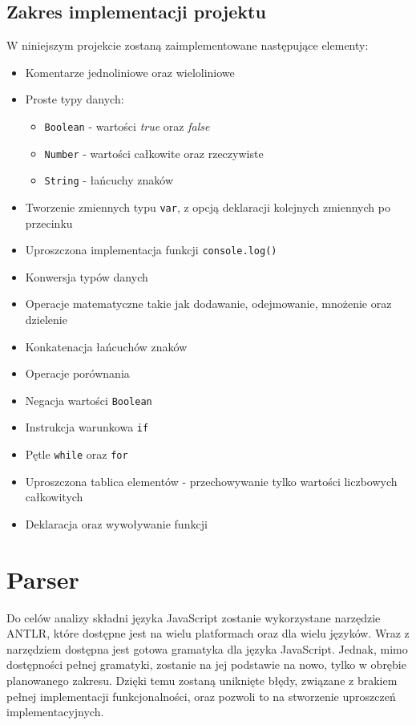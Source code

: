 \subsection{Zakres implementacji projektu}
W niniejszym projekcie zostaną zaimplementowane następujące elementy: 
\begin{itemize}
  \item Komentarze jednoliniowe oraz wieloliniowe
  \item Proste typy danych: 
  \begin{itemize}
    \item \texttt{Boolean} - wartości \textit{true} oraz \textit{false}
    \item \texttt{Number} - wartości całkowite oraz rzeczywiste
    \item \texttt{String} - łańcuchy znaków
  \end{itemize}
  \item Tworzenie zmiennych typu \texttt{var}, z opcją deklaracji kolejnych zmiennych po przecinku
  \item Uproszczona implementacja funkcji \texttt{console.log()}
  \item Konwersja typów danych
  \item Operacje matematyczne takie jak dodawanie, odejmowanie, mnożenie oraz dzielenie
  \item Konkatenacja łańcuchów znaków
  \item Operacje porównania
  \item Negacja wartości \texttt{Boolean}
  \item Instrukcja warunkowa \texttt{if}
  \item Pętle \texttt{while} oraz \texttt{for}
  \item Uproszczona tablica elementów - przechowywanie tylko wartości liczbowych całkowitych
  \item Deklaracja oraz wywoływanie funkcji
\end{itemize}


\section{Parser}
\par Do celów analizy składni języka JavaScript zostanie wykorzystane narzędzie ANTLR, które dostępne jest na wielu platformach oraz dla wielu języków. Wraz z narzędziem dostępna jest gotowa gramatyka dla języka JavaScript. Jednak, mimo dostępności pełnej gramatyki, zostanie na jej podstawie na nowo, tylko w obrębie planowanego zakresu. Dzięki temu zostaną uniknięte błędy, związane z brakiem pełnej implementacji funkcjonalności, oraz pozwoli to na stworzenie uproszczeń implementacyjnych.


